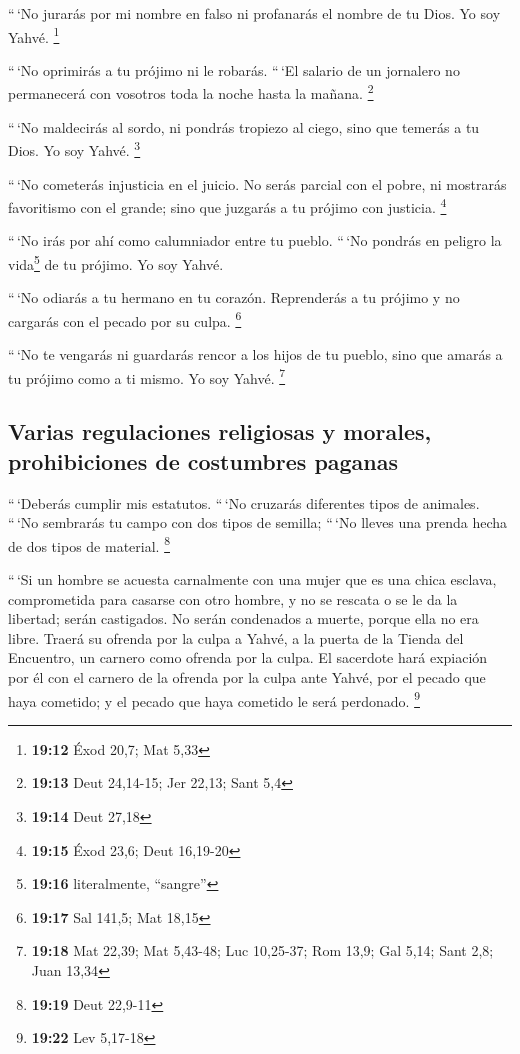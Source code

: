  ``\,`No jurarás por mi nombre en falso ni profanarás el
nombre de tu Dios. Yo soy Yahvé. \footnote{\textbf{19:12} Éxod 20,7; Mat
  5,33}

 ``\,`No oprimirás a tu prójimo ni le robarás. ``\,`El
salario de un jornalero no permanecerá con vosotros toda la noche hasta
la mañana. \footnote{\textbf{19:13} Deut 24,14-15; Jer 22,13; Sant 5,4}

 ``\,`No maldecirás al sordo, ni pondrás tropiezo al
ciego, sino que temerás a tu Dios. Yo soy Yahvé. \footnote{\textbf{19:14}
  Deut 27,18}

 ``\,`No cometerás injusticia en el juicio. No serás
parcial con el pobre, ni mostrarás favoritismo con el grande; sino que
juzgarás a tu prójimo con justicia. \footnote{\textbf{19:15} Éxod 23,6;
  Deut 16,19-20}

 ``\,`No irás por ahí como calumniador entre tu pueblo.
``\,`No pondrás en peligro la vida\footnote{\textbf{19:16} literalmente,
  ``sangre''} de tu prójimo. Yo soy Yahvé.

 ``\,`No odiarás a tu hermano en tu corazón. Reprenderás
a tu prójimo y no cargarás con el pecado por su culpa. \footnote{\textbf{19:17}
  Sal 141,5; Mat 18,15}

 ``\,`No te vengarás ni guardarás rencor a los hijos de
tu pueblo, sino que amarás a tu prójimo como a ti mismo. Yo soy Yahvé.
\footnote{\textbf{19:18} Mat 22,39; Mat 5,43-48; Luc 10,25-37; Rom 13,9;
  Gal 5,14; Sant 2,8; Juan 13,34}

\hypertarget{varias-regulaciones-religiosas-y-morales-prohibiciones-de-costumbres-paganas}{%
\subsection{Varias regulaciones religiosas y morales, prohibiciones de
costumbres
paganas}\label{varias-regulaciones-religiosas-y-morales-prohibiciones-de-costumbres-paganas}}

 ``\,`Deberás cumplir mis estatutos. ``\,`No cruzarás
diferentes tipos de animales. ``\,`No sembrarás tu campo con dos tipos
de semilla; ``\,`No lleves una prenda hecha de dos tipos de material.
\footnote{\textbf{19:19} Deut 22,9-11}

 ``\,`Si un hombre se acuesta carnalmente con una mujer
que es una chica esclava, comprometida para casarse con otro hombre, y
no se rescata o se le da la libertad; serán castigados. No serán
condenados a muerte, porque ella no era libre.  Traerá su
ofrenda por la culpa a Yahvé, a la puerta de la Tienda del Encuentro, un
carnero como ofrenda por la culpa.  El sacerdote hará
expiación por él con el carnero de la ofrenda por la culpa ante Yahvé,
por el pecado que haya cometido; y el pecado que haya cometido le será
perdonado. \footnote{\textbf{19:22} Lev 5,17-18}

